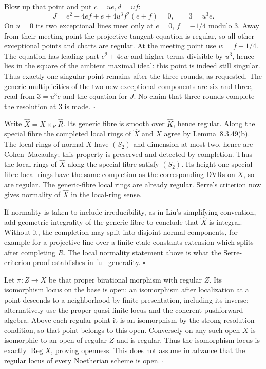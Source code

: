 \documentclass[11pt]{article}
\let\chapterexercise\exercise
\renewcommand{\exercise}[2]{\Needspace{8\baselineskip}\chapterexercise{#1}{#2}}
\begin{document}
Blow up that point and put $c=ue,d=uf$:
\[ J=e^2+4ef+e+4u^3f^2(e+f)=0,\qquad 3=u^3e. \]
On $u=0$ its two exceptional lines meet only at $e=0$, $f=-1/4$ modulo $3$. Away from their meeting point the projective tangent equation is regular, so all other exceptional points and charts are regular. At the meeting point use $w=f+1/4$. The equation has leading part $e^2+4ew$ and higher terms divisible by $u^3$, hence lies in the square of the ambient maximal ideal: this point is indeed still singular. Thus exactly one singular point remains after the three rounds, as requested. The generic multiplicities of the two new exceptional components are six and three, read from $3=u^3e$ and the equation for $J$. No claim that three rounds complete the resolution at $3$ is made. \hfill$\square$

\pf
Write $\widehat X=X\times_R\widehat R$. Its generic fibre is smooth over $\widehat K$, hence regular. Along the special fibre the completed local rings of $\widehat X$ and $X$ agree by Lemma~8.3.49(b). The local rings of normal $X$ have $(S_2)$ and dimension at most two, hence are Cohen--Macaulay; this property is preserved and detected by completion. Thus the local rings of $\widehat X$ along the special fibre satisfy $(S_2)$. Its height-one special-fibre local rings have the same completion as the corresponding DVRs on $X$, so are regular. The generic-fibre local rings are already regular. Serre's criterion now gives normality of $\widehat X$ in the local-ring sense.

If normality is taken to include irreducibility, as in Liu's simplifying convention, add geometric integrality of the generic fibre to conclude that $\widehat X$ is integral. Without it, the completion may split into disjoint normal components, for example for a projective line over a finite etale constants extension which splits after completing $R$. The local normality statement above is what the Serre-criterion proof establishes in full generality. \hfill$\square$

\pf
Let $\pi:Z\to X$ be that proper birational morphism with regular $Z$. Its isomorphism locus on the base is open: an isomorphism after localization at a point descends to a neighborhood by finite presentation, including its inverse; alternatively use the proper quasi-finite locus and the coherent pushforward algebra. Above each regular point it is an isomorphism by the strong-resolution condition, so that point belongs to this open. Conversely on any such open $X$ is isomorphic to an open of regular $Z$ and is regular. Thus the isomorphism locus is exactly $\operatorname{Reg}X$, proving openness. This does not assume in advance that the regular locus of every Noetherian scheme is open. \hfill$\square$
\end{document}
